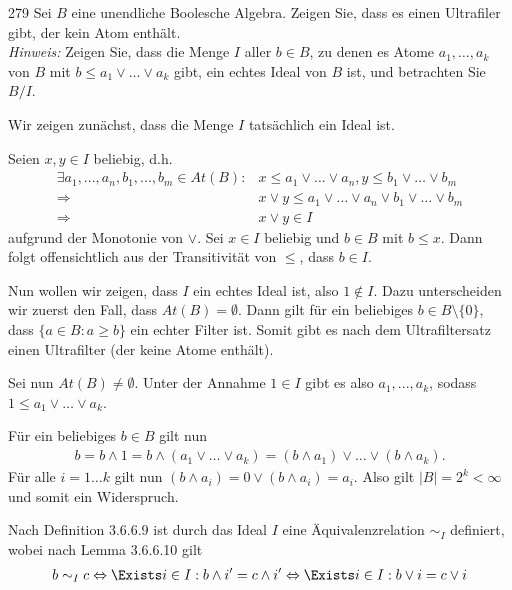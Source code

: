 \begin{algebraUE}{279}
Sei $B$ eine unendliche Boolesche Algebra. Zeigen Sie, dass es einen Ultrafiler gibt,
der kein Atom enthält. \\
\textit{Hinweis:} Zeigen Sie, dass die Menge $I$ aller $b \in B$, zu denen es
Atome $a_1,\dots,a_k$ von $B$ mit $b \leq a_1 \lor \dots \lor a_k$ gibt,
ein echtes Ideal von $B$ ist, und betrachten Sie $B/I$.
\end{algebraUE}
\begin{solution}
Wir zeigen zunächst, dass die Menge $I$ tatsächlich ein Ideal ist.

Seien $x, y \in I$ beliebig, d.h.
\begin{align*}
  \exists a_1,...,a_n,b_1,...,b_m \in At(B): &x \leq a_1 \lor \dots \lor a_n , y \leq b_1 \lor \dots \lor b_m \\
  \Rightarrow &x \lor y \leq a_1 \lor \dots \lor a_n \lor b_1 \lor \dots \lor b_m \\
  \Rightarrow &x\lor y \in I
\end{align*}
aufgrund der Monotonie von $\lor$.
Sei $x \in I$ beliebig und $b \in B$ mit $b \leq x$. Dann folgt offensichtlich aus der Transitivität von $\leq$, dass $b \in I$.



Nun wollen wir zeigen, dass $I$ ein echtes Ideal ist, also $1 \notin I$.
Dazu unterscheiden wir zuerst den Fall, dass $At(B) = \emptyset$. Dann gilt für ein beliebiges $b \in B\setminus \{ 0\}$, dass $\{ a \in B: a \geq b\}$ ein echter Filter ist. Somit gibt es nach dem Ultrafiltersatz einen Ultrafilter (der keine Atome enthält).

Sei nun $At(B) \neq \emptyset$. Unter der Annahme $1 \in I$ gibt es also $a_1,...,a_k$, sodass $1 \leq a_1 \lor \dots \lor a_k$.

Für ein beliebiges $b \in B$ gilt nun
\begin{align*}
  b = b \land 1 = b \land (a_1 \lor \dots \lor a_k) = (b \land a_1) \lor \dots \lor (b \land a_k).
\end{align*}
Für alle $i=1 \dots k$ gilt nun $(b \land a_i) = 0 \lor (b \land a_i) = a_i$. Also gilt $|B| = 2^k < \infty$ und somit ein Widerspruch.

Nach Definition 3.6.6.9 ist durch das Ideal $I$ eine Äquivalenzrelation $\sim_I$ definiert, wobei nach Lemma 3.6.6.10 gilt
\begin{align*}
  b \sim_I c \Leftrightarrow \Exists i \in I: b \land i' = c \land i' \Leftrightarrow \Exists i \in I: b \lor i = c \lor i
\end{align*}


\end{solution}
